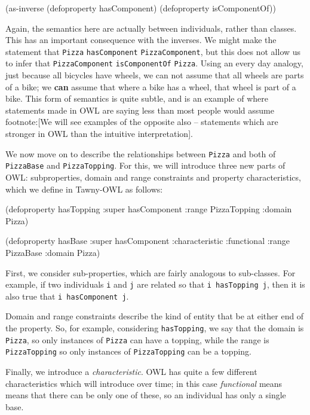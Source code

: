 \documentclass[11pt]{article}
\begin{document}
\begin{tawny}
(as-inverse
 (defoproperty hasComponent)
 (defoproperty isComponentOf))
\end{tawny}

Again, the semantics here are actually between individuals, rather than
classes. This has an important consequence with the inverses. We might make
the statement that \verb~Pizza~ \verb~hasComponent~ \verb~PizzaComponent~, but this does not
allow us to infer that \verb~PizzaComponent~ \verb~isComponentOf~ \verb~Pizza~. Using an
every day analogy, just because all bicycles have wheels, we can not assume
that all wheels are parts of a bike; we \textbf{can} assume that where a bike has a
wheel, that wheel is part of a bike. This form of semantics is quite subtle,
and is an example of where statements made in OWL are saying less than most
people would assume footnote:[We will see examples of the opposite also --
statements which are stronger in OWL than the intuitive interpretation].

We now move on to describe the relationships between \verb~Pizza~ and both of
\verb~PizzaBase~ and \verb~PizzaTopping~. For this, we will introduce three new parts of
OWL: subproperties, domain and range constraints and property characteristics,
which we define in Tawny-OWL as follows:


\begin{tawny}
(defoproperty hasTopping
  :super hasComponent
  :range PizzaTopping
  :domain Pizza)

(defoproperty hasBase
  :super hasComponent
  :characteristic :functional
  :range PizzaBase
  :domain Pizza)
\end{tawny}


First, we consider sub-properties, which are fairly analogous to sub-classes.
For example, if two individuals \verb~i~ and \verb~j~ are related so that \verb~i hasTopping j~, then it is also true that \verb~i hasComponent j~.

Domain and range constraints describe the kind of entity that be at either end
of the property. So, for example, considering \verb~hasTopping~, we say that the
domain is \verb~Pizza~, so only instances of \verb~Pizza~ can have a topping, while the
range is \verb~PizzaTopping~ so only instances of \verb~PizzaTopping~ can be a topping. 

Finally, we introduce a \emph{characteristic}. OWL has quite a few different
characteristics which will introduce over time; in this case \emph{functional}
means means that there can be only one of these, so an individual has only a
single base.
\end{document}
